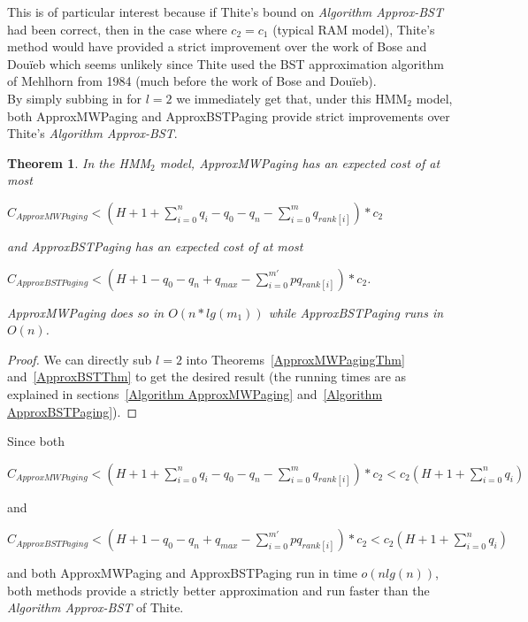 \documentclass[letterpaper,12pt,titlepage,oneside,final]{book}
\theoremstyle{plain}
\newtheorem{thm}{Theorem}[section]
\begin{document}
This is of particular interest because if Thite's bound on \textit{Algorithm Approx-BST} had been correct, then in the case where $c_2=c_1$ (typical RAM model), Thite's method would have provided a strict improvement over the work of Bose and Dou\"{i}eb \cite{bose2009efficient} which seems unlikely since Thite used the BST approximation algorithm of Mehlhorn from 1984 \cite{mehlhorn1984sorting} (much before the work of Bose and Dou\"{i}eb). \\




By simply subbing in for $l=2$ we immediately get that, under this HMM$_2$ model, both ApproxMWPaging and ApproxBSTPaging provide strict improvements over Thite's \textit{Algorithm Approx-BST}. 

\begin{thm}
In the HMM$_2$ model, ApproxMWPaging has an expected cost of at most \\
\begin{center}
$C_{ApproxMWPaging} < (H + 1 + \sum_{i=0}^n q_i - q_0 - q_n - \sum_{i=0}^m q_{rank[i]}) * c_2$
\end{center}
and ApproxBSTPaging has an expected cost of at most \\
\begin{center}
$C_{ApproxBSTPaging} <  (H + 1 - q_0 - q_n + q_{max} - \sum_{i=0}^{m'} pq_{rank[i]})*c_2$.
\end{center}
ApproxMWPaging does so in $O(n*lg(m_1))$ while ApproxBSTPaging runs in $O(n)$.
\end{thm}

\begin{proof}
We can directly sub $l=2$ into Theorems~\ref{ApproxMWPagingThm} and~\ref{ApproxBSTThm} to get the desired result (the running times are as explained in sections~\ref{Algorithm ApproxMWPaging} and~\ref{Algorithm ApproxBSTPaging}).
\end{proof}

Since both \\
\begin{center}
$ C_{ApproxMWPaging} < (H + 1 + \sum_{i=0}^n q_i - q_0 - q_n - \sum_{i=0}^m q_{rank[i]}) * c_2 < c_2(H+1+\sum_{i=0}^{n}q_i)$
\end{center}
 and
 \begin{center}
 $C_{ApproxBSTPaging} < (H + 1 - q_0 - q_n + q_{max} - \sum_{i=0}^{m'} pq_{rank[i]})*c_2 < c_2(H+1+\sum_{i=0}^{n}q_i)$
 \end{center}

and both ApproxMWPaging and ApproxBSTPaging run in time $o(nlg(n))$, both methods provide a strictly better approximation and run faster than the \textit{Algorithm Approx-BST} of Thite.
\end{document}

